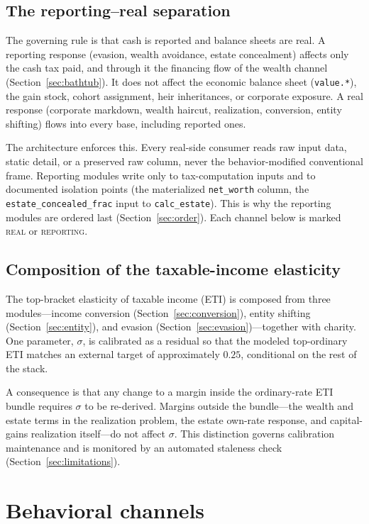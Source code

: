\documentclass[11pt]{article}
\newcommand{\code}[1]{\texttt{\small #1}}
\begin{document}
\subsection{The reporting--real separation}
\label{sec:firewall}
The governing rule is that cash is reported and balance sheets are real. A
reporting response (evasion, wealth avoidance, estate concealment) affects only
the cash tax paid, and through it the financing flow of the wealth channel
(Section~\ref{sec:bathtub}). It does not affect the economic balance sheet
(\code{value.*}), the gain stock, cohort assignment, heir inheritances, or
corporate exposure. A real response (corporate markdown, wealth haircut,
realization, conversion, entity shifting) flows into every base, including
reported ones.

The architecture enforces this. Every real-side consumer reads raw input data,
static detail, or a preserved raw column, never the behavior-modified
conventional frame. Reporting modules write only to tax-computation inputs and
to documented isolation points (the materialized \code{net_worth} column, the
\code{estate_concealed_frac} input to \code{calc_estate}). This is why the
reporting modules are ordered last (Section~\ref{sec:order}). Each channel below
is marked \textsc{real} or \textsc{reporting}.

\subsection{Composition of the taxable-income elasticity}
\label{sec:eti}
The top-bracket elasticity of taxable income (ETI) is composed from three
modules---income conversion (Section~\ref{sec:conversion}), entity shifting
(Section~\ref{sec:entity}), and evasion (Section~\ref{sec:evasion})---together
with charity. One parameter, $\sigma$, is calibrated as a residual so that the
modeled top-ordinary ETI matches an external target of approximately $0.25$,
conditional on the rest of the stack.

A consequence is that any change to a margin inside the ordinary-rate ETI bundle
requires $\sigma$ to be re-derived. Margins outside the bundle---the wealth and
estate terms in the realization problem, the estate own-rate response, and
capital-gains realization itself---do not affect $\sigma$. This distinction
governs calibration maintenance and is monitored by an automated staleness check
(Section~\ref{sec:limitations}).

\section{Behavioral channels}
\label{sec:channels}
\end{document}
